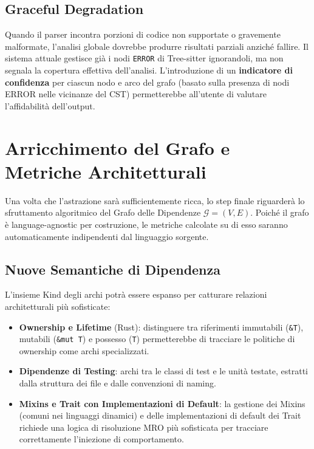 \subsection{Graceful Degradation}
Quando il parser incontra porzioni di codice non supportate o
gravemente malformate, l'analisi globale dovrebbe produrre risultati
parziali anziché fallire. Il sistema attuale gestisce già i nodi
\texttt{ERROR} di Tree-sitter ignorandoli, ma non segnala la
copertura effettiva dell'analisi. L'introduzione di un
\textbf{indicatore di confidenza} per ciascun nodo e arco del grafo
(basato sulla presenza di nodi ERROR nelle vicinanze del CST)
permetterebbe all'utente di valutare l'affidabilità dell'output.

\section{Arricchimento del Grafo e Metriche Architetturali}
Una volta che l'astrazione sarà sufficientemente ricca, lo step
finale riguarderà lo sfruttamento algoritmico del Grafo delle
Dipendenze $\mathcal{G} = (V, E)$. Poiché il grafo è
language-agnostic per costruzione, le metriche calcolate su di esso
saranno automaticamente indipendenti dal linguaggio sorgente.

\subsection{Nuove Semantiche di Dipendenza}
L'insieme $\text{Kind}$ degli archi potrà essere espanso per catturare
relazioni architetturali più sofisticate:
\begin{itemize}
  \item \textbf{Ownership e Lifetime} (Rust): distinguere tra
    riferimenti immutabili (\texttt{\&T}), mutabili (\texttt{\&mut T})
    e possesso (\texttt{T}) permetterebbe di tracciare le politiche di
    ownership come archi specializzati.
  \item \textbf{Dipendenze di Testing}: archi tra le classi di test e
    le unità testate, estratti dalla struttura dei file e dalle
    convenzioni di naming.
  \item \textbf{Mixins e Trait con Implementazioni di Default}: la
    gestione dei Mixins (comuni nei linguaggi dinamici) e delle
    implementazioni di default dei Trait richiede una logica di
    risoluzione MRO più sofisticata per tracciare correttamente
    l'iniezione di comportamento.
\end{itemize}

